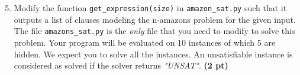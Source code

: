 \documentclass[11pt,a4paper]{report}
\begin{document}
\begin{enumerate}
	\setcounter{enumi}{4}
	\item Modify the function {\tt get\_expression(size)} in \texttt{amazon\_sat.py} such that it outputs a list
	of clauses modeling the n-amazons problem for the given input.
	The file \texttt{amazons\_sat.py} is the \emph{only} file that you need to modify to solve this problem. 
	Your program will be evaluated on 10 instances of which 5 are hidden. We expect you to solve all the instances.
	An unsatisfiable instance is considered as solved if the solver returns \textit{"UNSAT"}. \textbf{(2 pt)}
\end{enumerate}
\end{document}
